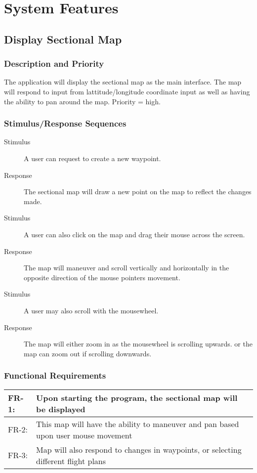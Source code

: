 \documentclass[12pt, letterpaper]{article}
\begin{document}
\section{System Features}
  \subsection{Display Sectional Map}
    \subsubsection{Description and Priority}
      The application will display the sectional map as the main interface.
      The map will respond to input from lattitude/longitude coordinate input as well
      as having the ability to pan around the map. Priority = high.
    \subsubsection{Stimulus/Response Sequences}
      \begin{description}
        \item[Stimulus] A user can request to create a new waypoint.
		\item[Response]	The sectional map will draw a new point on the map to
			reflect the changes made.
		\item[Stimulus] A user can also click on the map and drag their mouse 
			across the screen.
		\item[Response] The map will maneuver and scroll vertically and horizontally
			in the opposite direction of the mouse pointers movement.
		\item[Stimulus] A user may also scroll with the mousewheel.
		\item[Response] The map will either zoom in as the mousewheel is scrolling upwards.
			or the map can zoom out if scrolling downwards.
      \end{description}
    \subsubsection{Functional Requirements}
    \begin{tabularx}{\textwidth}{|l|X|} \hline
      FR-1: & Upon starting the program, the sectional map will be displayed\\ \hline
      FR-2: & This map will have the ability to maneuver and pan based upon user mouse movement\\ \hline
      FR-3: & Map will also respond to changes in waypoints, or selecting different flight plans\\ \hline
      \end{tabularx}
\end{document}
